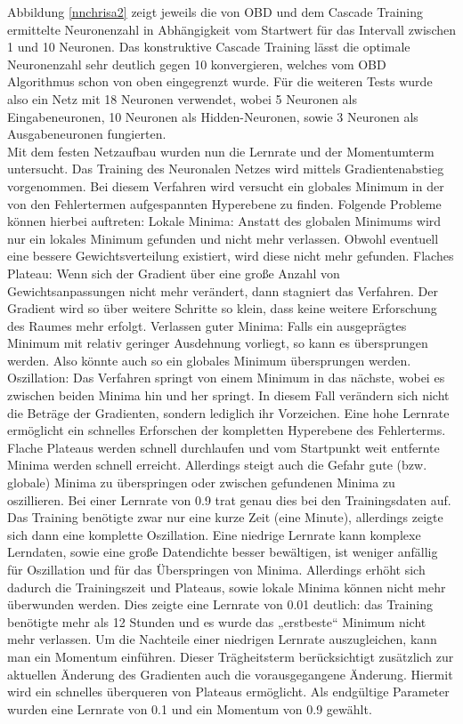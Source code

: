Abbildung \ref{nnchrisa2} zeigt jeweils die von OBD und dem Cascade Training ermittelte Neuronenzahl in Abhängigkeit vom Startwert für das Intervall zwischen 1 und 10 Neuronen. Das konstruktive Cascade Training lässt die optimale Neuronenzahl sehr deutlich gegen 10 konvergieren, welches vom OBD Algorithmus schon von oben eingegrenzt wurde. Für die weiteren Tests wurde also ein Netz mit 18 Neuronen verwendet, wobei 5 Neuronen als Eingabeneuronen, 10 Neuronen als Hidden-Neuronen, sowie 3 Neuronen als Ausgabeneuronen fungierten.\\

Mit dem festen Netzaufbau wurden nun die Lernrate und der Momentumterm untersucht. Das Training des Neuronalen Netzes wird mittels Gradientenabstieg vorgenommen. Bei diesem Verfahren wird versucht ein globales Minimum in der von den Fehlertermen aufgespannten Hyperebene zu finden. Folgende Probleme können hierbei auftreten:
Lokale Minima: Anstatt des globalen Minimums wird nur ein lokales Minimum gefunden und nicht mehr verlassen. Obwohl eventuell eine bessere Gewichtsverteilung existiert, wird diese nicht mehr gefunden.
Flaches Plateau: Wenn sich der Gradient über eine große Anzahl von Gewichtsanpassungen nicht mehr verändert, dann stagniert das Verfahren. Der Gradient wird so über weitere Schritte so klein, dass keine weitere Erforschung des Raumes mehr erfolgt.
Verlassen guter Minima: Falls ein ausgeprägtes Minimum mit relativ geringer Ausdehnung vorliegt, so kann es übersprungen werden. Also könnte auch so ein globales Minimum übersprungen werden.
Oszillation: Das Verfahren springt von einem Minimum in das nächste, wobei es zwischen beiden Minima hin und her springt. In diesem Fall verändern sich nicht die Beträge der Gradienten, sondern lediglich ihr Vorzeichen.
Eine hohe Lernrate ermöglicht ein schnelles Erforschen der kompletten Hyperebene des Fehlerterms. Flache Plateaus werden schnell durchlaufen und vom Startpunkt weit entfernte Minima werden schnell erreicht. Allerdings steigt auch die Gefahr gute (bzw. globale) Minima zu überspringen oder zwischen gefundenen Minima zu oszillieren. Bei einer Lernrate von 0.9 trat genau dies bei den Trainingsdaten auf. Das Training benötigte zwar nur eine kurze Zeit (eine Minute), allerdings zeigte sich dann eine komplette Oszillation.
Eine niedrige Lernrate kann komplexe Lerndaten, sowie eine große Datendichte besser bewältigen, ist weniger anfällig für Oszillation und für das Überspringen von Minima. Allerdings erhöht sich dadurch die Trainingszeit und Plateaus, sowie lokale Minima können nicht mehr überwunden werden. Dies zeigte eine Lernrate von 0.01 deutlich: das Training benötigte mehr als 12 Stunden und es wurde das „erstbeste“ Minimum nicht mehr verlassen.
Um die Nachteile einer niedrigen Lernrate auszugleichen, kann man ein Momentum einführen. Dieser Trägheitsterm berücksichtigt zusätzlich zur aktuellen Änderung des Gradienten auch die vorausgegangene Änderung. Hiermit wird ein schnelles überqueren von Plateaus ermöglicht.
Als endgültige Parameter wurden eine Lernrate von 0.1 und ein Momentum von 0.9 gewählt.\\

